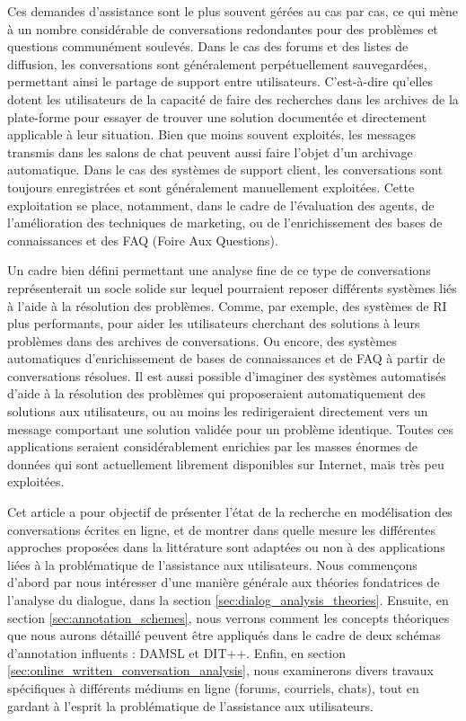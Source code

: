 \documentclass[10pt,a4paper,twoside]{article}
\begin{document}
Ces demandes d'assistance sont le plus souvent gérées au cas par cas, ce qui mène à un nombre considérable de conversations redondantes pour des problèmes et questions communément soulevés. Dans le cas des forums et des listes de diffusion, les conversations sont généralement perpétuellement sauvegardées, permettant ainsi le partage de support entre utilisateurs. C'est-à-dire qu'elles dotent les utilisateurs de la capacité de faire des recherches dans les archives de la plate-forme pour essayer de trouver une solution documentée et directement applicable à leur situation. Bien que moins souvent exploités, les messages transmis dans les salons de chat peuvent aussi faire l'objet d'un archivage automatique. Dans le cas des systèmes de support client, les conversations sont toujours enregistrées et sont généralement manuellement exploitées. Cette exploitation se place, notamment, dans le cadre de l'évaluation des agents, de l'amélioration des techniques de marketing, ou de l'enrichissement des bases de connaissances et des FAQ (Foire Aux Questions).

Un cadre bien défini permettant une analyse fine de ce type de conversations représenterait un socle solide sur lequel pourraient reposer différents systèmes liés à l'aide à la résolution des problèmes. Comme, par exemple, des systèmes de RI plus performants, pour aider les utilisateurs cherchant des solutions à leurs problèmes dans des archives de conversations. Ou encore, des systèmes automatiques d'enrichissement de bases de connaissances et de FAQ à partir de conversations résolues. Il est aussi possible d'imaginer des systèmes automatisés d'aide à la résolution des problèmes qui proposeraient automatiquement des solutions aux utilisateurs, ou au moins les redirigeraient directement vers un message comportant une solution validée pour un problème identique. Toutes ces applications seraient considérablement enrichies par les masses énormes de données qui sont actuellement librement disponibles sur Internet, mais très peu exploitées.

Cet article a pour objectif de présenter l'état de la recherche en modélisation des conversations écrites en ligne, et de montrer dans quelle mesure les différentes approches proposées dans la littérature sont adaptées ou non à des applications liées à la problématique de l'assistance aux utilisateurs. Nous commençons d'abord par nous intéresser d'une manière générale aux théories fondatrices de l'analyse du dialogue, dans la section \ref{sec:dialog_analysis_theories}. Ensuite, en section \ref{sec:annotation_schemes}, nous verrons comment les concepts théoriques que nous aurons détaillé peuvent être appliqués dans le cadre de deux schémas d'annotation influents : DAMSL et DIT++. Enfin, en section \ref{sec:online_written_conversation_analysis}, nous examinerons divers travaux spécifiques à différents médiums en ligne (forums, courriels, chats), tout en gardant à l'esprit la problématique de l'assistance aux utilisateurs.
\end{document}

